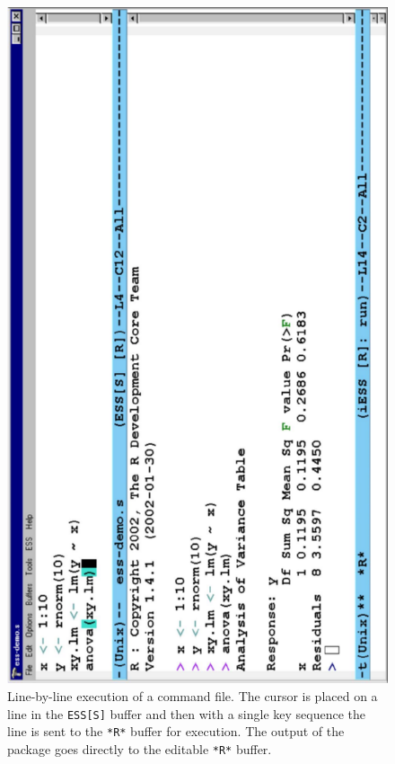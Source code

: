 \documentclass{article}
\newif\ifdraft
\newcommand{\stexttt}[1]{{\small\texttt{#1}}}
\newcommand{\emptyfig}{
\hspace*{42pt}\rule{324pt}{.25pt}\\
\hspace*{42pt}\rule{.25pt}{10pc}
\rule{316pt}{.25pt}
\rule{.25pt}{10pc}}
\begin{document}
\begin{figure}[tb] %
  \centering
  \ifdraft
     \emptyfig
  \else
     \includegraphics[angle=270,width=\textwidth]{ess-demo}
  \fi
  \caption{Line-by-line execution of a command file. The cursor is
    placed on a line in the \stexttt{ESS[S]} buffer and then with a single
    key sequence
    the line is sent to the \stexttt{*R*} buffer for
    execution.  The output of the package goes directly to the
    editable \stexttt{*R*} buffer.}
  \label{f.ess-demo}
\end{figure}
\end{document}
